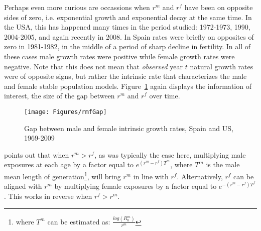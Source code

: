 Perhaps even more curious are occassions when $r^m$ and $r^f$ have been on
opposite sides of zero, i.e. exponential growth and exponential decay at the
same time. In the USA, this has happened many times in the period studied:
1972-1973, 1990, 2004-2005, and again recently in 2008. In Spain rates were 
briefly on opposites of zero in 1981-1982, in the middle of a period of sharp
decline in fertility. In all of these cases male growth rates were positive
while female growth rates were negative. Note that this does not mean that 
\textit{observed} year $t$ natural growth rates were of opposite signs, but
rather the intrinsic rate that characterizes the male and female stable
population models.
Figure~\ref{fig:rmfGap} again displays the information of interest, the size of the gap between $r^m$ and $r^f$ over time.

\begin{figure}[ht!]
        \centering  
          \caption{Gap between male and female intrinsic growth rates, Spain and
          US, 1969-2009}
           \texttt{[image: Figures/rmfGap]}
          \label{fig:rmfGap}
\end{figure}

\citet[p. 57]{coale1972growth} points out that when $r^m > r^f$, as was
typically the case here, multiplying male exposures at each age by a factor equal to
$e^{(r^m - r^f)T^m}$, where $T^m$ is the male mean length of
generation\footnote{where $T^m$ can be estimated as:
$\frac{log(R_0^m)}{r^m}$}, will bring $r^m$ in line with $r^f$. Alternatively,
$r^f$ can be aligned with $r^m$ by multiplying female exposures by a factor equal
 to $e^{-(r^m - r^f)T^f}$. This works in reverse when $r^f > r^m$.

 \FloatBarrier
